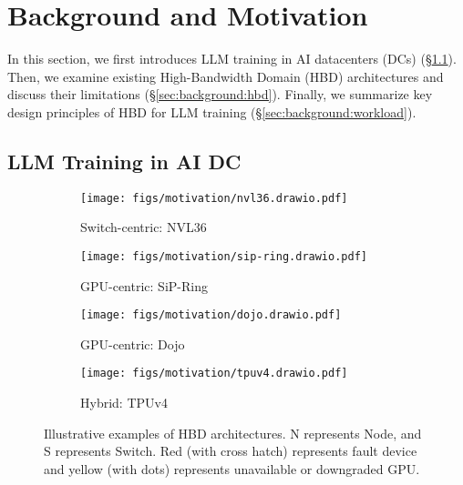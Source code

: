 \section{Background and Motivation}
\label{sec:background}
In this section, we first introduces LLM training in AI datacenters (DCs) (\S\ref{sec:background:llm_training}). Then, we examine existing High-Bandwidth Domain (HBD) architectures and discuss their limitations (\S\ref{sec:background:hbd}). Finally, we summarize key design principles of HBD for LLM training (\S\ref{sec:background:workload}).

\subsection{LLM Training in AI DC}
\label{sec:background:llm_training}

\begin{figure*}[!t]
\centering
\begin{subfigure}[b]{0.25\textwidth}
    \centering
    \texttt{[image: figs/motivation/nvl36.drawio.pdf]}
    \caption{Switch-centric: NVL36}
    \label{fig:hbd-archs:nvl36}
\end{subfigure}
\hspace{-1ex}\hfil\hspace{-1ex}
\begin{subfigure}[b]{0.24\textwidth}
    \centering
    \texttt{[image: figs/motivation/sip-ring.drawio.pdf]}
    \caption{GPU-centric: SiP-Ring}
    \label{fig:hbd-archs:sip-ring}
\end{subfigure}
\hspace{-1ex}\hfil\hspace{-1ex}
\begin{subfigure}[b]{0.24\textwidth}
    \centering
    \texttt{[image: figs/motivation/dojo.drawio.pdf]}
    \caption{GPU-centric: Dojo}
    \label{fig:hbd-archs:dojo}
\end{subfigure}
\hspace{-1ex}\hfil\hspace{-1ex}
\begin{subfigure}[b]{0.25\textwidth}
    \centering
    \texttt{[image: figs/motivation/tpuv4.drawio.pdf]}
    \caption{Hybrid: TPUv4}
    \label{fig:hbd-archs:tpuv4}
\end{subfigure}
\vspace{-2ex}
\caption{Illustrative examples of HBD architectures. N represents Node, and S represents Switch. Red (with cross hatch) represents fault device and yellow (with dots) represents unavailable or downgraded GPU.}
\label{fig:hbd-archs}
\vspace{-1ex}
\end{figure*}

